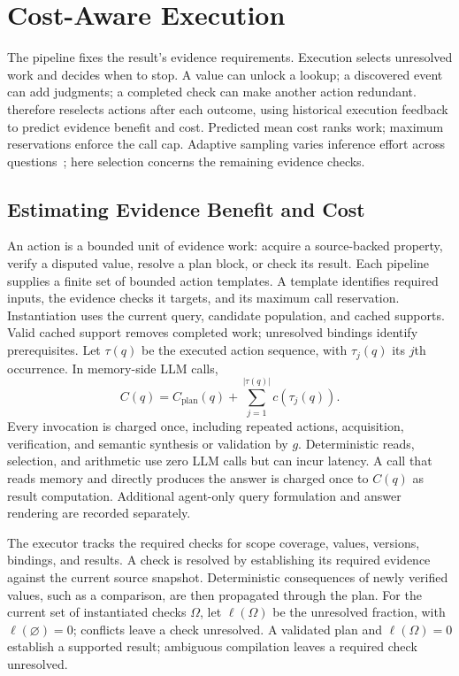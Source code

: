 \section{Cost-Aware Execution}
\label{sec:executor}

The pipeline fixes the result's evidence requirements. Execution selects
unresolved work and decides when to stop. A value can unlock a lookup;
a discovered event can add judgments; a completed check can make another
action redundant. \sys{} therefore reselects actions after each outcome,
using historical execution feedback to predict evidence benefit and cost.
Predicted mean cost ranks work; maximum reservations enforce the call
cap. Adaptive sampling varies inference effort across
questions~\cite{adaptiveconsistency,escsc}; here selection concerns the
remaining evidence checks.

\subsection{Estimating Evidence Benefit and Cost}
\label{subsec:new-budget}

An action is a bounded unit of evidence work: acquire a source-backed
property, verify a disputed value, resolve a plan block, or check its result.
Each pipeline supplies a finite set of bounded action templates. A
template identifies required inputs, the evidence checks it targets,
and its maximum call reservation. Instantiation uses the current query,
candidate population, and cached supports. Valid cached support removes
completed work; unresolved bindings identify prerequisites.
Let $\tau(q)$ be the executed action sequence, with $\tau_j(q)$ its
$j$th occurrence. In memory-side LLM calls,
\begin{equation}
\label{eq:cost}
C(q)=C_{\mathrm{plan}}(q)+\sum_{j=1}^{|\tau(q)|}c(\tau_j(q)).
\end{equation}
Every invocation is charged once, including repeated actions,
acquisition, verification, and semantic synthesis or validation by $g$.
Deterministic reads, selection, and arithmetic use zero LLM calls but
can incur latency. A call that reads memory and directly produces the
answer is charged once to $C(q)$ as result computation. Additional
agent-only query formulation and answer rendering are recorded separately.

The executor tracks the required checks for scope coverage, values,
versions, bindings, and results. A check is resolved by establishing its
required evidence against the current source snapshot. Deterministic
consequences of newly verified values, such as a comparison, are then
propagated through the plan.
For the current set of instantiated checks $\Omega$, let
$\ell(\Omega)$ be the unresolved fraction, with $\ell(\varnothing)=0$;
conflicts leave a check
unresolved. A validated plan and $\ell(\Omega)=0$ establish a supported
result; ambiguous compilation leaves a required check unresolved.

